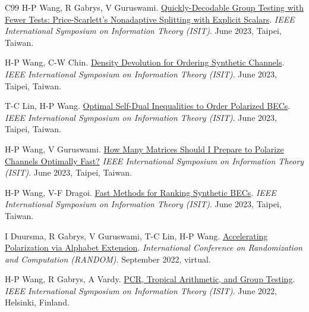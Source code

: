 \documentclass{article}
\begin{document}
\begin{thebibliography}{C99}
    H-P Wang, R Gabrys, V Guruswami.
    \href{https://doi.org/10.1109/ISIT54713.2023.10206843}
    {Quickly-Decodable Group Testing with Fewer Tests: Price-Scarlett's Nonadaptive Splitting with Explicit Scalars}.
    \emph{IEEE International Symposium on Information Theory (ISIT)}.
    June 2023, Taipei, Taiwan.

    H-P Wang, C-W Chin.
    \href{https://doi.org/10.1109/ISIT54713.2023.10206540}
    {Density Devolution for Ordering Synthetic Channels}.
    \emph{IEEE International Symposium on Information Theory (ISIT)}.
    June 2023, Taipei, Taiwan.

    T-C Lin, H-P Wang.
    \href{https://doi.org/10.1109/ISIT54713.2023.10206451}
    {Optimal Self-Dual Inequalities to Order Polarized BECs}.
    \emph{IEEE International Symposium on Information Theory (ISIT)}.
    June 2023, Taipei, Taiwan.

    H-P Wang, V Guruswami.
    \href{https://doi.org/10.1109/ISIT54713.2023.10206989}
    {How Many Matrices Should I Prepare to Polarize Channels Optimally Fast?}
    \emph{IEEE International Symposium on Information Theory (ISIT)}.
    June 2023, Taipei, Taiwan.

    H-P Wang, V-F Dragoi.
    \href{https://doi.org/10.1109/ISIT54713.2023.10206704}
    {Fast Methods for Ranking Synthetic BECs}.
    \emph{IEEE International Symposium on Information Theory (ISIT)}.
    June 2023, Taipei, Taiwan.

    I Duursma, R Gabrys, V Guruswami, T-C Lin, H-P Wang.
    \href{https://doi.org/10.4230/LIPIcs.APPROX/RANDOM.2022.17}
    {Accelerating Polarization via Alphabet Extension}.
    \emph{International Conference on Randomization and Computation (RANDOM)}.
    September 2022, virtual.

    H-P Wang, R Gabrys, A Vardy.
    \href{https://doi.org/10.1109/ISIT50566.2022.9834718}
    {PCR, Tropical Arithmetic, and Group Testing}.
    \emph{IEEE International Symposium on Information Theory (ISIT)}.
    June 2022, Helsinki, Finland.
\end{thebibliography}
\egroup
\end{document}
